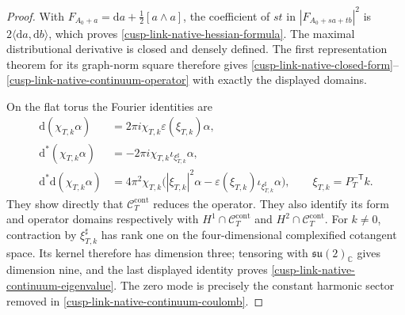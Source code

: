 \documentclass[11pt]{article}
\theoremstyle{definition}
\numberwithin{equation}{section}
\begin{document}
\begin{proof}
With \(F_{A_0+a}=\mathrm da+\tfrac12[a\wedge a]\), the coefficient of
\(st\) in \(|F_{A_0+sa+tb}|^2\) is
\(2\langle\mathrm da,\mathrm db\rangle\), which proves
\eqref{cusp-link-native-hessian-formula}.  The maximal distributional
derivative is closed and densely defined.  The first representation theorem
for its graph-norm square therefore gives
\eqref{cusp-link-native-closed-form}--\eqref{cusp-link-native-continuum-operator}
with exactly the displayed domains.

On the flat torus the Fourier identities are
\begin{align*}
 \mathrm d(\chi_{T,k}\alpha)
 &=2\pi i\chi_{T,k}\varepsilon(\xi_{T,k})\alpha,\\
 \mathrm d^*(\chi_{T,k}\alpha)
 &=-2\pi i\chi_{T,k}\iota_{\xi_{T,k}^\sharp}\alpha,\\
 \mathrm d^*\mathrm d(\chi_{T,k}\alpha)
 &=4\pi^2\chi_{T,k}
   \bigl(|\xi_{T,k}|^2\alpha
   -\varepsilon(\xi_{T,k})\iota_{\xi_{T,k}^\sharp}\alpha\bigr),
 \qquad \xi_{T,k}=P_T^{-\mathsf T}k.
\end{align*}
They show directly that \(\mathscr C_T^{\mathrm{cont}}\) reduces the operator.
They also identify its form and operator domains respectively with
\(H^1\cap\mathscr C_T^{\mathrm{cont}}\) and
\(H^2\cap\mathscr C_T^{\mathrm{cont}}\).  For \(k\ne0\), contraction by
\(\xi_{T,k}^\sharp\) has rank one on the four-dimensional complexified
cotangent space.  Its kernel therefore has dimension three; tensoring with
\(\mathfrak{su}(2)_{\mathbb C}\) gives dimension nine, and the last displayed
identity proves \eqref{cusp-link-native-continuum-eigenvalue}.  The zero mode
is precisely the constant harmonic sector removed in
\eqref{cusp-link-native-continuum-coulomb}.


\end{proof}
\end{document}
